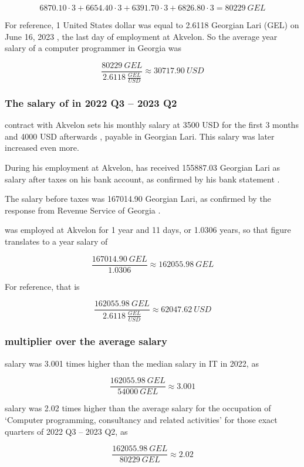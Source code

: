 \[
    6870.10 \cdot 3 + 6654.40 \cdot 3 + 6391.70 \cdot 3 + 6826.80 \cdot 3 = 80229\:GEL
\]

For reference, 1 United States dollar was equal to 2.6118 Georgian Lari (GEL) on June 16, 2023
,
the last day of \mrls employment at Akvelon.
So the average year salary of a computer programmer in Georgia was

\[
    \frac{80229\:GEL}{2.6118\:\frac{GEL}{USD}} \approx 30717.90\:USD
\]


\subsubsection{The salary of \mrl in 2022 Q3 -- 2023 Q2}

\mrls contract with Akvelon sets his monthly salary at 3500 USD for the first 3 months
and 4000 USD afterwards , payable in Georgian Lari.
This salary was later increased even more.

During his employment at Akvelon, \mrl has received 155887.03 Georgian Lari as salary after taxes on his bank account,
as confirmed by his bank statement .

The salary before taxes was 167014.90 Georgian Lari,
as confirmed by the response from Revenue Service of Georgia .

\mrl was employed at Akvelon for 1 year and 11 days, or 1.0306 years,
so that figure translates to a year salary of

\[
    \frac{167014.90\:GEL}{1.0306} \approx 162055.98\:GEL
\]

For reference, that is

\[
    \frac{162055.98\:GEL}{2.6118\:\frac{GEL}{USD}} \approx 62047.62\:USD
\]


\subsubsection{\mrls multiplier over the average salary}


\mrls salary was 3.001 times higher than the median salary in IT in 2022, as

\[
    \frac{162055.98\:GEL}{54000\:GEL} \approx 3.001
\]


\mrls salary was 2.02 times higher than the average salary for the occupation
of `Computer programming, consultancy and related activities' for those exact quarters of 2022 Q3 -- 2023 Q2, as

\[
    \frac{162055.98\:GEL}{80229\:GEL} \approx 2.02
\]

\pagebreak
